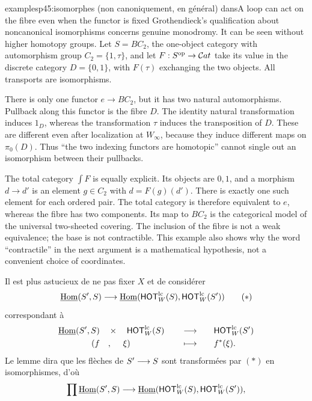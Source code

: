 \begin{dcomment}{examples}{p45:isomorphes (non canoniquement, en général) dans}{A loop can act on the fibre even when the functor is fixed}
Grothendieck's qualification about noncanonical isomorphisms concerns genuine monodromy. It can be seen without higher homotopy groups. Let $S=BC_2$, the one-object category with automorphism group $C_2=\{1,\tau\}$, and let $F:S^{\mathrm{op}}\to\mathcal{C}at$ take its value in the discrete category $D=\{0,1\}$, with $F(\tau)$ exchanging the two objects. All transports are isomorphisms.

There is only one functor $e\to BC_2$, but it has two natural automorphisms. Pullback along this functor is the fibre $D$. The identity natural transformation induces $1_D$, whereas the transformation $\tau$ induces the transposition of $D$. These are different even after localization at $W_\infty$, because they induce different maps on $\pi_0(D)$. Thus ``the two indexing functors are homotopic'' cannot single out an isomorphism between their pullbacks.

The total category $\int F$ is equally explicit. Its objects are $0,1$, and a morphism $d\to d'$ is an element $g\in C_2$ with $d=F(g)(d')$. There is exactly one such element for each ordered pair. The total category is therefore equivalent to $e$, whereas the fibre has two components. Its map to $BC_2$ is the categorical model of the universal two-sheeted covering. The inclusion of the fibre is not a weak equivalence; the base is not contractible. This example also shows why the word ``contractile'' in the next argument is a mathematical hypothesis, not a convenient choice of coordinates.
\end{dcomment}


Il est plus astucieux de ne pas fixer $X$ et de considérer
\[ \uHom(S',S)\fl\uHom(\HOT^{\mathrm{lc}}_W(S),\HOT^{\mathrm{lc}}_W(S')) \tag*{$(*)$} \]
correspondant à
\[
\begin{aligned}
\underline{\operatorname{Hom}}(S',S) &\quad\times\quad \mathsf{HOT}^{\mathrm{lc}}_W(S) &&\quad\longrightarrow\quad &&\mathsf{HOT}^{\mathrm{lc}}_W(S')\\
(f &\quad,\quad\ \xi) &&\quad\longmapsto\quad && f^*(\xi).
\end{aligned}
\]
Le lemme dira que les flèches de $S'\longrightarrow S$ sont transformées par $(*)$ en isomorphismes, d'où
\[ \prod\underline{\operatorname{Hom}}(S',S)\longrightarrow\underline{\operatorname{Hom}}(\mathsf{HOT}^{\mathrm{lc}}_W(S),\mathsf{HOT}^{\mathrm{lc}}_W(S')), \]


